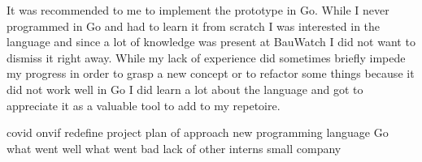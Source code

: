 It was recommended to me to implement the prototype in Go.
While I never programmed in Go and had to learn it from scratch I was interested in the language and since a lot of knowledge was present at BauWatch I did not want to dismiss it right away.
While my lack of experience did sometimes briefly impede my progress in order to grasp a new concept or to refactor some things because it did not work well in Go I did learn a lot about the language and got to appreciate it as a valuable tool to add to my repetoire.


covid
onvif
redefine project
plan of approach
new programming language Go
what went well
what went bad
lack of other interns
small company

